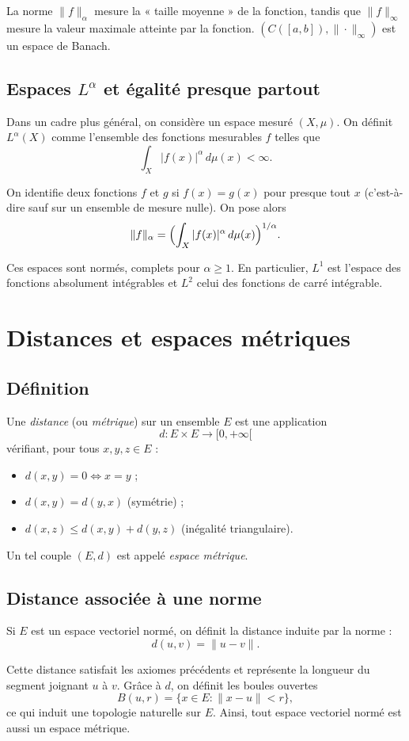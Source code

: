 La norme \(\|f\|_\alpha\) mesure la « taille moyenne » de la fonction,
tandis que \(\|f\|_\infty\) mesure la valeur maximale atteinte par la fonction.
\((C([a,b]),\|\cdot\|_\infty)\) est un espace de Banach.

\subsection{Espaces \(L^\alpha\) et \'egalit\'e presque partout}

Dans un cadre plus g\'en\'eral, on consid\`ere un espace mesur\'e \((X,\mu)\).
On d\'efinit \(L^\alpha(X)\) comme l’ensemble des fonctions mesurables \(f\) telles que
\[
\int_X |f(x)|^\alpha \, d\mu(x) < \infty.
\]

On identifie deux fonctions \(f\) et \(g\) si \(f(x)=g(x)\) pour presque tout \(x\) (c’est-\`a-dire sauf sur un ensemble de mesure nulle).
On pose alors
\[
\|f\|_\alpha = \Bigl(\int_X |f(x)|^\alpha\,d\mu(x)\Bigr)^{1/\alpha}.
\]

Ces espaces sont norm\'es, complets pour \(\alpha\ge 1\).
En particulier, \(L^1\) est l’espace des fonctions absolument int\'egrables
et \(L^2\) celui des fonctions de carr\'e int\'egrable.

\section{Distances et espaces m\'etriques}

\subsection{D\'efinition}

Une \emph{distance} (ou \emph{m\'etrique}) sur un ensemble \(E\) est une application
\[
d:E\times E\to [0,+\infty[
\]
v\'erifiant, pour tous \(x,y,z\in E\) :
\begin{itemize}
  \item \(d(x,y)=0 \iff x=y\) ;
  \item \(d(x,y)=d(y,x)\) (sym\'etrie) ;
  \item \(d(x,z)\le d(x,y)+d(y,z)\) (in\'egalit\'e triangulaire).
\end{itemize}

Un tel couple \((E,d)\) est appel\'e \emph{espace m\'etrique}.

\subsection{Distance associ\'ee \`a une norme}

Si \(E\) est un espace vectoriel norm\'e, on d\'efinit la distance induite par la norme :
\[
d(u,v) = \|u-v\|.
\]

Cette distance satisfait les axiomes pr\'ec\'edents et repr\'esente la longueur du segment joignant \(u\) \`a \(v\).
Gr\^ace \`a \(d\), on d\'efinit les boules ouvertes
\[
B(u,r) = \{x\in E : \|x-u\|<r\},
\]
ce qui induit une topologie naturelle sur \(E\).
Ainsi, tout espace vectoriel norm\'e est aussi un espace m\'etrique.
